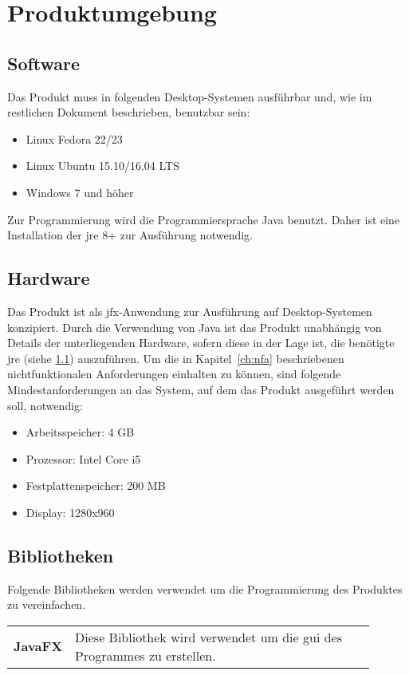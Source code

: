\chapter{Produktumgebung}
\label{ch:umgebung}

\section{Software}\label{sec:software}
Das Produkt muss in folgenden Desktop-Systemen ausführbar und, wie im restlichen Dokument beschrieben, benutzbar sein:
\begin{itemize}
  \setlength\itemsep{0em}
  \item Linux Fedora 22/23 %
  \item Linux Ubuntu 15.10/16.04 LTS
  \item Windows 7 und höher
\end{itemize}
Zur Programmierung wird die Programmiersprache Java benutzt. Daher ist eine Installation der \gls{jre} 8+ zur Ausführung notwendig.

\section{Hardware}
Das Produkt ist als \gls{jfx}-Anwendung zur Ausführung auf Desktop-Systemen konzipiert.
Durch die Verwendung von Java ist das Produkt unabhängig von Details der unterliegenden Hardware, sofern diese in der Lage ist, die benötigte \gls{jre} (siehe \ref{sec:software}) auszuführen.
Um die in Kapitel~\ref{ch:nfa} beschriebenen nichtfunktionalen Anforderungen einhalten zu können, sind folgende Mindestanforderungen an das System, auf dem das Produkt ausgeführt werden soll, notwendig:

\begin{itemize}
  \setlength\itemsep{0em}
  \item Arbeitsspeicher: 4 GB
  \item Prozessor: Intel Core i5 %
  \item Festplattenspeicher: 200 MB 
  \item Display: 1280x960
\end{itemize}

\section{Bibliotheken}
Folgende Bibliotheken werden verwendet um die Programmierung des Produktes zu vereinfachen. \\

\begin{tabular}{ >{\bfseries}l p{0.9 \linewidth}}
  JavaFX & Diese Bibliothek wird verwendet um die \gls{gui} des Programmes zu erstellen.
\end{tabular}
